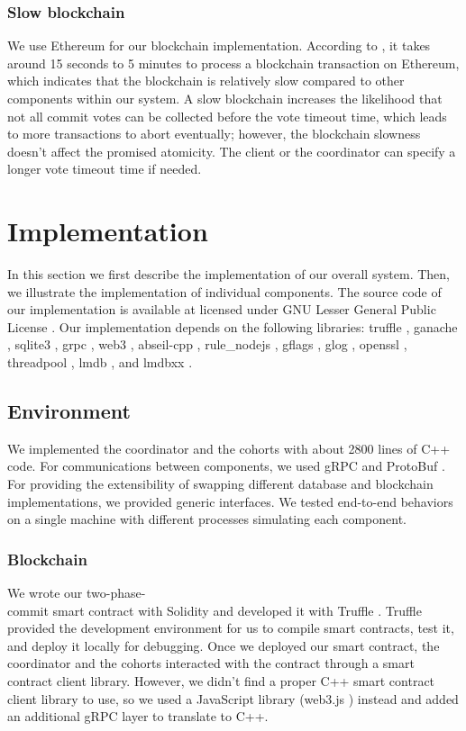 \documentclass[11pt,sigplan,screen,nonacm]{acmart}
\begin{document}
\subsubsection{Slow blockchain}
We use Ethereum for our blockchain implementation. According to \cite{stationlong}, it takes around 15 seconds to 5 minutes to process a blockchain transaction on Ethereum, which indicates that the blockchain is relatively slow compared to other components within our system. A slow blockchain increases the likelihood that not all commit votes can be collected before the vote timeout time, which leads to more transactions to abort eventually; however, the blockchain slowness doesn’t affect the promised atomicity. The client or the coordinator can specify a longer vote timeout time if needed.

\section{Implementation}
In this section we first describe the implementation of our overall system. Then, we illustrate the implementation of individual components. The source code of our implementation is available at licensed under GNU Lesser General Public License \cite{lgpl}. Our implementation depends on the following libraries: truffle \cite{github_truffle}, ganache \cite{github_ganache}, sqlite3 \cite{github_sqlite3}, grpc \cite{github_grpc}, web3 \cite{github_web3}, abseil-cpp \cite{github_absl}, rule\_nodejs \cite{github_rulejs}, gflags \cite{github_gflags}, glog \cite{github_glog}, openssl \cite{github_openssl}, threadpool \cite{Shoshany2021_ThreadPool}, lmdb \cite{github_lmdb}, and lmdbxx \cite{github_lmdbxx}.

\subsection{Environment}
We implemented the coordinator and the cohorts with about 2800 lines of C++ code. For communications between components, we used gRPC \cite{github_grpc} and ProtoBuf \cite{github_proto}. For providing the extensibility of swapping different database and blockchain implementations, we provided generic interfaces. We tested end-to-end behaviors on a single machine with different processes simulating each component.

\subsubsection{Blockchain}
We wrote our two-phase-\\commit smart contract with Solidity and developed it with Truffle \cite{github_truffle}. Truffle provided the development environment for us to compile smart contracts, test it, and deploy it locally for debugging. Once we deployed our smart contract, the coordinator and the cohorts interacted with the contract through a smart contract client library. However, we didn’t find a proper C++ smart contract client library to use, so we used a JavaScript library (web3.js \cite{github_web3}) instead and added an additional gRPC layer to translate to C++.
\end{document}
